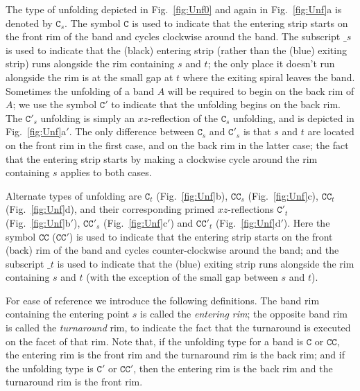 \documentclass[11pt]{article}
\def\c{\mathtt{C}}
\def\cc{\mathtt{CC}}
\begin{document}
The type of unfolding depicted in Fig.~\ref{fig:Unf0} and again in Fig.~\ref{fig:Unf}a is denoted by $\c_s$. The symbol $\c$ is used to indicate that the entering strip starts on the front rim of the band and cycles clockwise around the band. The subscript $\_s$ is used to indicate that the (black)
entering strip (rather than the (blue) exiting strip) runs alongside the rim containing $s$ and $t$; the only place it doesn't run alongside the rim is at the small gap at $t$ where the exiting spiral leaves the band.
Sometimes the unfolding of a band $A$ will be required to begin on the back rim of $A$; we use the symbol $\c'$ to indicate that the unfolding begins on the back rim. The $\c'_s$ unfolding is simply an $xz$-reflection of the $\c_s$ unfolding, and is depicted in Fig.~\ref{fig:Unf}a$'$. The only difference between $\c_s$ and $\c'_s$ is that $s$ and $t$ are located on the front rim in the first case, and on the back rim in the latter case; the fact that the entering strip starts by making a clockwise cycle around the rim containing $s$ applies to both cases.

Alternate types of unfolding are $\c_t$ (Fig.~\ref{fig:Unf}b), $\cc_s$ (Fig.~\ref{fig:Unf}c), $\cc_t$ (Fig.~\ref{fig:Unf}d), and their corresponding primed $xz$-reflections $\c'_t$ (Fig.~\ref{fig:Unf}b$'$), $\cc'_s$ (Fig.~\ref{fig:Unf}c$'$) and $\cc'_t$ (Fig.~\ref{fig:Unf}d$'$). Here the symbol $\cc$ ($\cc'$) is used to indicate that the entering strip starts on the front (back) rim of the band and cycles counter-clockwise around the band; and the subscript $\_t$ is used to indicate that
the (blue) exiting strip runs alongside the rim containing $s$ and $t$ (with the exception of the small gap between $s$ and $t$).


For ease of reference we introduce the following definitions. The band rim containing the entering point $s$ is called the \emph{entering rim}; the opposite band rim is called the \emph{turnaround} rim, to indicate the fact that the turnaround is executed on the facet of that rim. Note that, if the unfolding type for a band is $\c$ or $\cc$, the entering rim is the front rim and the turnaround rim is the back rim; and if the unfolding type is $\c'$ or $\cc'$, then the entering rim is the back rim and the turnaround rim is the front rim. 
\end{document}
